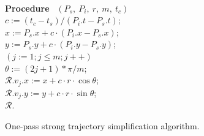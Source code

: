 \begin{figure}[tb!]
\begin{center}
{\begin{minipage}{3.3in}
{					%
					\\
					{\bf Procedure} ~$(P_s,~P_i,~r,~m,~t_c)$ \\
					\bcc \hspace{1ex} $c := (t_c-t_s)/(P_i.t - P_s.t)$; \\
					\icc \hspace{1ex} $x := P_s.x + c\cdot(P_i.x-P_s.x)$; \\
					\icc \hspace{1ex} $y := P_s.y + c\cdot(P_i.y-P_s.y)$; \\
					\icc \hspace{1ex} \For $(j := 1;j \le m;j++)$ \Do \\
					\icc \> \hspace{2ex} $\theta :=  (2j + 1)*\pi /m $; \\
					\icc \> \hspace{2ex} $\mathcal{R}.v_j.x := x + c\cdot r\cdot\cos\theta$;\\
					\icc \> \hspace{2ex} $\mathcal{R}.v_j.y := y + c\cdot r\cdot\sin\theta$;\\
					\icc \hspace{1ex} \Return $\mathcal{R}$.
				}
				\vspace{-2ex}
				\myhrule
			\end{minipage}
		}
	\end{center}
	\vspace{-1ex}
	\caption{\small One-pass strong trajectory  simplification algorithm.}
	\label{alg:CI3d}
	\vspace{-1ex}
\end{figure}





